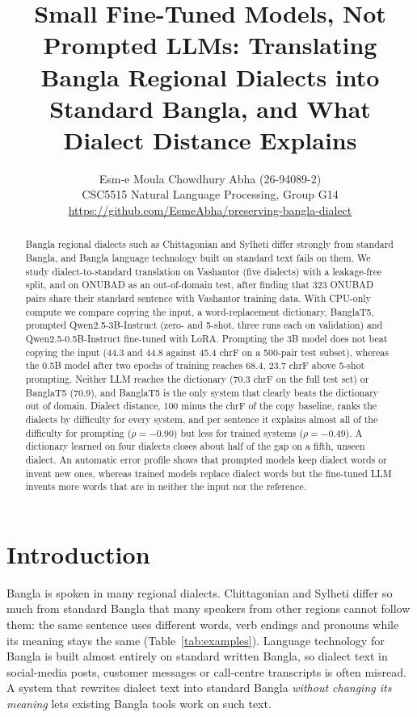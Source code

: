 \documentclass[10pt,twocolumn]{article}
\title{\Large\textbf{Small Fine-Tuned Models, Not Prompted LLMs: Translating Bangla Regional Dialects into
Standard Bangla, and What Dialect Distance Explains}}
\author{Esm-e Moula Chowdhury Abha (26-94089-2)\\[2pt]
\small CSC5515 Natural Language Processing, Group G14\\
\small\url{https://github.com/EsmeAbha/preserving-bangla-dialect}}
\date{}
\begin{document}
\maketitle

\begin{abstract}
Bangla regional dialects such as Chittagonian and Sylheti differ strongly from standard Bangla, and Bangla
language technology built on standard text fails on them. We study dialect-to-standard translation on
Vashantor (five dialects) with a leakage-free split, and on ONUBAD as an out-of-domain test, after finding that
323 ONUBAD pairs share their standard sentence with Vashantor training data. With CPU-only compute we compare
copying the input, a word-replacement dictionary, BanglaT5, prompted Qwen2.5-3B-Instruct (zero- and 5-shot,
three runs each on validation) and Qwen2.5-0.5B-Instruct fine-tuned with LoRA. Prompting the 3B model does not
beat copying the input (44.3 and 44.8 against 45.4 chrF on a 500-pair test subset), whereas the
0.5B model after two epochs of training reaches 68.4, 23.7 chrF above 5-shot prompting. Neither LLM reaches
the dictionary (70.3 chrF on the full test set) or BanglaT5 (70.9), and BanglaT5 is the only
system that clearly beats the dictionary out of domain. Dialect distance, 100 minus the chrF of the copy
baseline, ranks the dialects by difficulty for every system, and per sentence it explains almost all of the
difficulty for prompting ($\rho=-0.90$) but less for trained systems ($\rho=-0.49$). A dictionary
learned on four dialects closes about half of the gap on a fifth, unseen dialect. An automatic error profile
shows that prompted models keep dialect words or invent new ones, whereas trained models replace dialect words
but the fine-tuned LLM invents more words that are in neither the input nor the reference.
\end{abstract}

\section{Introduction}
Bangla is spoken in many regional dialects. Chittagonian and Sylheti differ so much from standard Bangla
that many speakers from other regions cannot follow them: the same sentence uses different words, verb
endings and pronouns while its meaning stays the same (Table~\ref{tab:examples}). Language technology for
Bangla is built almost entirely on standard written Bangla, so dialect text in social-media posts, customer
messages or call-centre transcripts is often misread. A system that rewrites dialect text into standard Bangla
\emph{without changing its meaning} lets existing Bangla tools work on such text.
\end{document}
